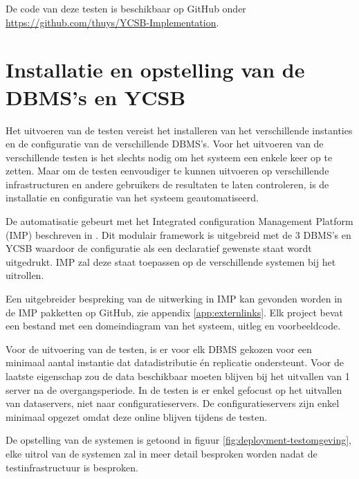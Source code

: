 De code van deze testen is beschikbaar op GitHub onder  \url{https://github.com/thuys/YCSB-Implementation}. 

\section{Installatie en opstelling van de DBMS's en YCSB}
Het uitvoeren van de testen vereist het installeren van het verschillende instanties en de configuratie van de verschillende DBMS's. Voor het uitvoeren van de verschillende testen is het slechts nodig om het systeem een enkele keer op te zetten. Maar om de testen eenvoudiger te kunnen uitvoeren op verschillende infrastructuren en andere gebruikers de resultaten te laten controleren, is de installatie en configuratie van het systeem geautomatiseerd. 

De automatisatie gebeurt met het Integrated configuration Management Platform (IMP) beschreven in \cite{KULeuven-453199}. Dit modulair framework is uitgebreid met de 3 DBMS's en YCSB waardoor de configuratie als een declaratief gewenste staat wordt uitgedrukt. IMP zal deze staat toepassen op de verschillende systemen bij het uitrollen. 

Een uitgebreider bespreking van de uitwerking in IMP kan gevonden worden in de IMP pakketten op GitHub, zie appendix \ref{app:externlinks}. Elk project bevat een bestand met een domeindiagram van het systeem, uitleg en voorbeeldcode. 

Voor de uitvoering van de testen, is er voor elk DBMS gekozen voor een minimaal aantal instantie dat datadistributie én replicatie ondersteunt. Voor de laatste eigenschap zou de data beschikbaar moeten blijven bij het uitvallen van 1 server na de overgangsperiode. In de testen is er enkel gefocust op het uitvallen van dataservers, niet naar configuratieservers. De configuratieservers zijn enkel minimaal opgezet omdat deze online blijven tijdens de testen.  

De opstelling van de systemen is getoond in figuur \ref{fig:deployment-testomgeving}, elke uitrol van de systemen zal in meer detail besproken worden nadat de testinfrastructuur is besproken.  

